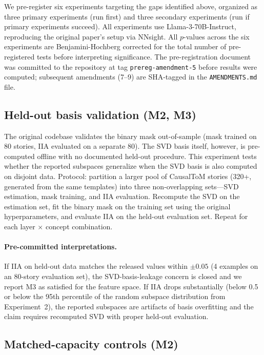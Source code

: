 \documentclass[11pt]{article}
\begin{document}
We pre-register six experiments targeting the gaps identified above, organized as three primary experiments (run first) and three secondary experiments (run if primary experiments succeed). All experiments use Llama-3-70B-Instruct, reproducing the original paper's setup via NNsight. All $p$-values across the six experiments are Benjamini-Hochberg corrected for the total number of pre-registered tests before interpreting significance. The pre-registration document was committed to the repository at tag \texttt{prereg-amendment-5} before results were computed; subsequent amendments (7--9) are SHA-tagged in the \texttt{AMENDMENTS.md} file.

\subsection{Held-out basis validation (M2, M3)}

The original codebase validates the binary mask out-of-sample (mask trained on 80 stories, IIA evaluated on a separate 80). The SVD basis itself, however, is pre-computed offline with no documented held-out procedure. This experiment tests whether the reported subspaces generalize when the SVD basis is also computed on disjoint data. Protocol: partition a larger pool of CausalToM stories (320+, generated from the same templates) into three non-overlapping sets---SVD estimation, mask training, and IIA evaluation. Recompute the SVD on the estimation set, fit the binary mask on the training set using the original hyperparameters, and evaluate IIA on the held-out evaluation set. Repeat for each layer $\times$ concept combination.

\paragraph{Pre-committed interpretations.} If IIA on held-out data matches the released values within $\pm 0.05$ (4 examples on an 80-story evaluation set), the SVD-basis-leakage concern is closed and we report M3 as satisfied for the feature space. If IIA drops substantially (below 0.5 or below the 95th percentile of the random subspace distribution from Experiment~2), the reported subspaces are artifacts of basis overfitting and the claim requires recomputed SVD with proper held-out evaluation.

\subsection{Matched-capacity controls (M2)}
\end{document}
